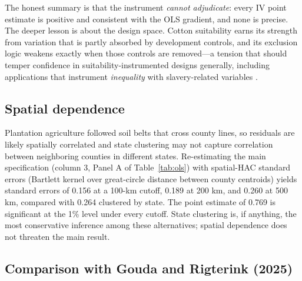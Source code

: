 \documentclass[12pt]{article}
\begin{document}
The honest summary is that the instrument \emph{cannot adjudicate}: every IV point estimate is positive and consistent with the OLS gradient, and none is precise. The deeper lesson is about the design space. Cotton suitability earns its strength from variation that is partly absorbed by development controls, and its exclusion logic weakens exactly when those controls are removed---a tension that should temper confidence in suitability-instrumented designs generally, including applications that instrument \emph{inequality} with slavery-related variables \citep{buonanno2019}.

\subsection{Spatial dependence}\label{sec:conley}

Plantation agriculture followed soil belts that cross county lines, so residuals are likely spatially correlated and state clustering may not capture correlation between neighboring counties in different states. Re-estimating the main specification (column 3, Panel A of Table~\ref{tab:ols}) with \citet{conley1999} spatial-HAC standard errors (Bartlett kernel over great-circle distance between county centroids) yields standard errors of 0.156 at a 100-km cutoff, 0.189 at 200 km, and 0.260 at 500 km, compared with 0.264 clustered by state. The point estimate of 0.769 is significant at the 1\% level under every cutoff. State clustering is, if anything, the most conservative inference among these alternatives; spatial dependence does not threaten the main result.

\subsection{Comparison with Gouda and Rigterink (2025)}\label{sec:gouda}
\end{document}

